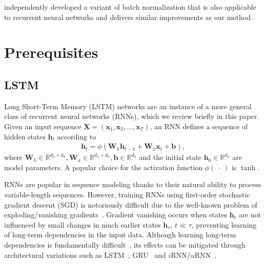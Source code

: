 \documentclass{article} %
\newcommand{\vect}[1]{\mathbf{#1}}
\newcommand{\mat}[1]{\mathbf{#1}}
\newcommand{\reals}{\mathbb{R}}
\begin{document}
\citet{ba2016layer} independently developed a variant of batch normalization that is
also applicable to recurrent neural networks and delivers similar improvements as 
our method.

\section{Prerequisites}
\label{sec:prerequisites}

\subsection{LSTM}

Long Short-Term Memory (LSTM) networks are an instance of a more general class of recurrent neural
networks (RNNs), which we review briefly in this paper.  Given an input sequence $\mat{X} = ( \vect{x}_1,
\vect{x}_2, \ldots, \vect{x}_T )$, an RNN defines a sequence of hidden states $\vect{h}_t$
according to
\begin{eqnarray}
  \vect{h}_t = \phi(\mat{W}_h \vect{h}_{t-1} + \mat{W}_x  \vect{x}_t + \vect{b}),
\end{eqnarray}
where $\mat{W}_h \in \reals^{d_h \times d_h}, \mat{W}_x \in \reals^{d_x \times d_h}, \vect{b} \in \reals^{d_h}$
and the initial state $\vect{h}_0 \in \reals^{d_h}$ %
are model parameters.
A popular choice for the activation function $\phi(\ \cdot\ )$ is $\tanh$.

RNNs are popular in sequence modeling thanks to their natural ability to process variable-length sequences.
However, training RNNs using first-order stochastic gradient descent (SGD) is notoriously difficult
due to the well-known problem of exploding/vanishing gradients~\citep{bengio1994learning,hochreiter1991untersuchungen,pascanudifficulty}.
Gradient vanishing occurs when states $\vect{h}_t$ are not influenced by small changes in much earlier states $\vect{h}_{\tau}$, $t \ll \tau$,
preventing learning of long-term dependencies in the input data.
Although learning long-term dependencies is fundamentally difficult~\citep{bengio1994learning},
its effects can be mitigated through architectural variations such as LSTM~\citep{lstm}, GRU~\citep{cho2014learning} and $i$RNN/$u$RNN~\citep{le2015simple,urnn}.
\end{document}
